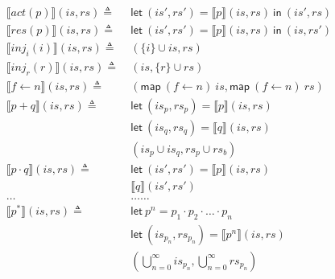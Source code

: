 \documentclass[12pt, letterpaper]{article}
\begin{document}
\begin{align*}
            \\
        \llbracket act(p) \rrbracket(\mathit{is}, \mathit{rs})
            \triangleq\ &
            \mathsf{let}\ (\mathit{is}',\mathit{rs}')
            = \llbracket p\rrbracket(\mathit{is}, \mathit{rs})\ 
            \mathsf{in}\ (\mathit{is}',\mathit{rs}) 
            \\
        \llbracket res(p) \rrbracket(\mathit{is}, \mathit{rs})
            \triangleq\ &
            \mathsf{let}\ (\mathit{is}',\mathit{rs}')
            = \llbracket p\rrbracket(\mathit{is}, \mathit{rs})\ 
            \mathsf{in}\ (\mathit{is},\mathit{rs}')
            \\
        \llbracket inj_{i}(i) \rrbracket(\mathit{is}, \mathit{rs})
            \triangleq\ &
            (\{i\} \cup \mathit{is}, \mathit{rs})
            \\
        \llbracket inj_{r}(r) \rrbracket(\mathit{is}, \mathit{rs})
            \triangleq\ &
            (\mathit{is}, \{r\} \cup \mathit{rs})
            \\
        \llbracket f \leftarrow n \rrbracket(\mathit{is}, \mathit{rs})
            \triangleq\ &
            (\mathsf{map}\ (f\leftarrow n)\ \mathit{is},
             \mathsf{map}\ (f\leftarrow n)\ \mathit{rs})
            \\
         \llbracket p + q \rrbracket(\mathit{is}, \mathit{rs})
            \triangleq\ &
            \mathsf{let}\ (\mathit{is}_p,\mathit{rs}_p) =
            \llbracket p \rrbracket(\mathit{is}, \mathit{rs}) 
            \\
            &\mathsf{let}\ (\mathit{is}_q,\mathit{rs}_q) =
            \llbracket q \rrbracket(\mathit{is}, \mathit{rs}) 
            \\
            &(\mathit{is}_p \cup \mathit{is}_q,\mathit{rs}_p \cup \mathit{rs}_b) 
            \\
        \llbracket p \cdot q \rrbracket(\mathit{is}, \mathit{rs})
            \triangleq\ &
            \mathsf{let}\ (\mathit{is}',\mathit{rs}') =
            \llbracket p \rrbracket(\mathit{is}, \mathit{rs})
            \\
            &\llbracket q \rrbracket(\mathit{is}', \mathit{rs}')
            \\
        \dots & \dots \dots \\
        \llbracket p ^{*} \rrbracket (\mathit{is}, \mathit{rs})
            \triangleq\ &
            \mathsf{let}\ p^{n} = p_{1} \cdot p_{2} \cdot \ldots \cdot p_{n}
            \\
            &\mathsf{let}\ (\mathit{is_{p_{n}}}, \mathit{rs_{p_{n}}}) = \llbracket p^{n} \rrbracket (is, rs)
            \\
            &(\bigcup^{\infty}_{n=0} \mathit{is_{p_{n}}}, \bigcup^{\infty}_{n=0} \mathit{rs_{p_{n}}})
            \\
    \end{align*}
\end{document}

